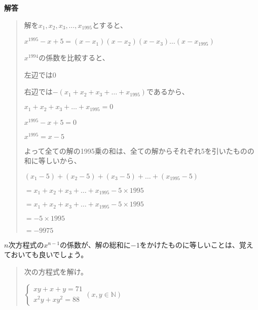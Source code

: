 \documentclass[uplatex,fleqn]{jsbook}
\begin{document}
\vspace{15pt} {\large \textbf{解答}}
\begin{quote}
    解を$x_1,x_2,x_3,\dots,x_{1995}$とすると、

    $x^{1995}-x+5=(x-x_1)(x-x_2)(x-x_3)\dots (x-x_{1995})$

    $x^{1994}$の係数を比較すると、

    左辺では$0$

    右辺では$-(x_1+x_2+x_3+\dots +x_{1995})$であるから、

    $x_1+x_2+x_3+\dots +x_{1995}=0$

    $x^{1995}-x+5=0$

    $x^{1995}=x-5$

    よって全ての解の1995乗の和は、全ての解からそれぞれ5を引いたものの和に等しいから、

    $(x_1-5)+(x_2-5)+(x_3-5)+\dots +(x_{1995}-5)$

    $=x_1+x_2+x_3+\dots +x_{1995}-5\times 1995$

    $=x_1+x_2+x_3+\dots +x_{1995}-5\times 1995$

    $=-5\times 1995$

    $=-9975$
\end{quote}
$n$次方程式の$x^{n-1}$の係数が、解の総和に$-1$をかけたものに等しいことは、覚えておいても良いでしょう。

\begin{quote}
    次の方程式を解け。

    \begin{math}
        \begin{cases}
            xy+x+y=71\\
            x^2y+xy^2=88
        \end{cases}
        (x,y\in\mathbb{N})
    \end{math}
\end{quote}
\end{document}
